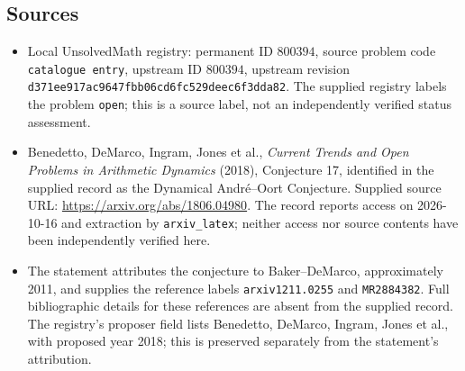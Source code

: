\documentclass[11pt]{article}
\begin{document}
\subsection{Sources}
\begin{itemize}
\item Local UnsolvedMath registry: permanent ID \(800394\), source problem code \texttt{catalogue entry}, upstream ID \(800394\), upstream revision \texttt{d371ee917ac9647fbb06cd6fc529deec6f3dda82}. The supplied registry labels the problem \texttt{open}; this is a source label, not an independently verified status assessment.
\item Benedetto, DeMarco, Ingram, Jones et al., \emph{Current Trends and Open Problems in Arithmetic Dynamics} (2018), Conjecture 17, identified in the supplied record as the Dynamical Andr{\'e}--Oort Conjecture. Supplied source URL: \url{https://arxiv.org/abs/1806.04980}. The record reports access on 2026-10-16 and extraction by \texttt{arxiv\_latex}; neither access nor source contents have been independently verified here.
\item The statement attributes the conjecture to Baker--DeMarco, approximately 2011, and supplies the reference labels \texttt{arxiv1211.0255} and \texttt{MR2884382}. Full bibliographic details for these references are absent from the supplied record. The registry's proposer field lists Benedetto, DeMarco, Ingram, Jones et al., with proposed year 2018; this is preserved separately from the statement's attribution.
\end{itemize}
\end{document}

